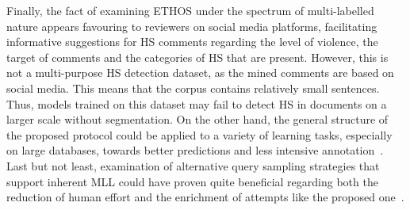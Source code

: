 \documentclass{article}
\begin{document}
Finally, the fact of examining ETHOS under the spectrum of multi-labelled nature appears favouring to reviewers on social media platforms, facilitating informative suggestions for HS comments regarding the level of violence, the target of comments and the categories of HS that are present. However, this is not a multi-purpose HS detection dataset, as the mined comments are based on social media. This means that the corpus contains relatively small sentences. Thus, models trained on this dataset may fail to detect HS in documents on a larger scale without segmentation. On the other hand, the general structure of the proposed protocol could be applied to a variety of learning tasks, especially on large databases, towards better predictions and less intensive annotation~\cite{DBLP:journals/biomedsem/DrameMD16}. Last but not least, examination of alternative query sampling strategies that support inherent MLL could have proven quite beneficial regarding both the reduction of human effort and the enrichment of attempts like the proposed one~\cite{DBLP:journals/jcst/KumarG20}.
\end{document}
